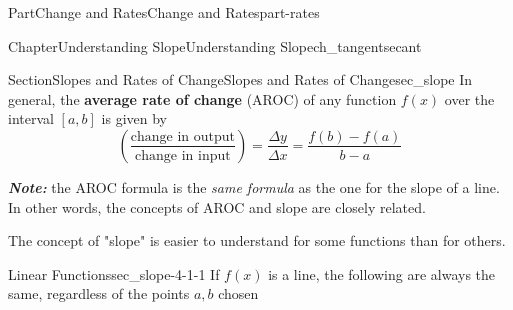 \documentclass[oneside,10pt,]{tufte-book}
\newcommand{\alert}[1]{\textbf{\textit{#1}}}
\newcommand{\terminology}[1]{\textbf{#1}}
\numberwithin{equation}{chapter}
\begin{document}
\begin{partptx}{Part}{Change and Rates}{}{Change and Rates}{}{}{part-rates}
\begin{chapterptx}{Chapter}{Understanding Slope}{}{Understanding Slope}{}{}{ch_tangentsecant}
\begin{introduction}{}
\begin{image}{0}{1}{0}{}
{
}%
\end{image}%
\end{introduction}%
%
%
\typeout{************************************************}
\typeout{************************************************}
%
\begin{sectionptx}{Section}{Slopes and Rates of Change}{}{Slopes and Rates of Change}{}{}{sec_slope}
In general, the \terminology{average rate of change} (AROC) of any function \(f(x)\) over the interval \([a,b]\) is given by%
\begin{equation*}
\left(\dfrac{\text{change in output}}{\text{change in input}}\right) = \dfrac{\Delta y}{\Delta x} = \dfrac{f(b)-f(a)}{b-a}
\end{equation*}
%
\par
\alert{Note:} the AROC formula is the \emph{same formula} as the one for the slope of a line. In other words, the concepts of AROC and slope are closely related.%
\par
The concept of "slope" is easier to understand for some functions than for others.%
\begin{descriptionlist}
\begin{dlimedium}{Linear Functions}{sec_slope-4-1-1}%
If \(f(x)\) is a line, the following are always the same, regardless of the points \(a,b\) chosen%

\end{dlimedium}
\end{descriptionlist}
\end{sectionptx}
\end{chapterptx}
\end{partptx}
\end{document}
